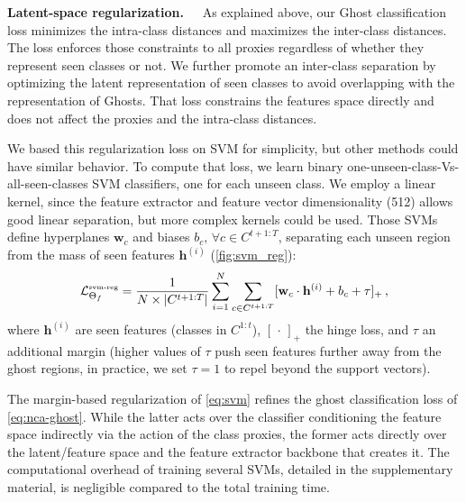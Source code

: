 


\label{sec:svm}
\textbf{Latent-space regularization.~~}
As explained above, our Ghost classification loss minimizes the intra-class distances and maximizes
the inter-class distances. The loss enforces those constraints to all proxies regardless of whether
they represent seen classes or not. We further promote an inter-class separation by optimizing the
latent representation of seen classes to avoid overlapping with the representation of Ghosts. That
loss constrains the features space directly and does not affect the proxies and the intra-class
distances.

We based this regularization loss on SVM \cite{cortes1995svm} for simplicity, but other methods
could have similar behavior. To compute that loss, we learn binary
one-unseen-class-Vs-all-seen-classes SVM classifiers, one for each unseen class. We employ a linear
kernel, since the feature extractor and feature vector dimensionality (512) allows good linear
separation, but more complex kernels could be used. Those SVMs define hyperplanes $\mathbf{w}_c$ and
biases $b_c,\, \forall c \in C^{t+1:T}$, separating each unseen region from the mass of seen
features $\mathbf{h}^{(i)}$ (\autoref{fig:svm_reg}):
%
\begin{equation}
    \mathcal{L}^\text{\tiny{svm-reg}}_{\Theta_f} = \frac{1} {N\times |C^{t+1:T}|}\sum_{i=1}^N \sum_{c\in C^{t+1:T}} [\mathbf{w}_c \cdot \mathbf{h}^{(i)} + b_c + \tau]_+\,,
    \label{eq:svm}
\end{equation}
%
where $\mathbf{h}^{(i)}$ are seen features (classes in $C^{1:t}$), $[\,\cdot\,]_+$ the hinge loss,
and $\tau$ an additional margin (higher values of $\tau$ push seen features further away from the
ghost regions, in practice, we set $\tau=1$ to repel beyond the support vectors).

The margin-based regularization of \autoref{eq:svm} refines the ghost classification loss of
\autoref{eq:nca-ghost}. While the latter acts over the classifier conditioning the feature space
indirectly via the action of the class proxies, the former acts directly over the latent/feature
space and the feature extractor backbone that creates it. The computational overhead of training
several SVMs, detailed in the supplementary material, is negligible compared to the total training
time.

